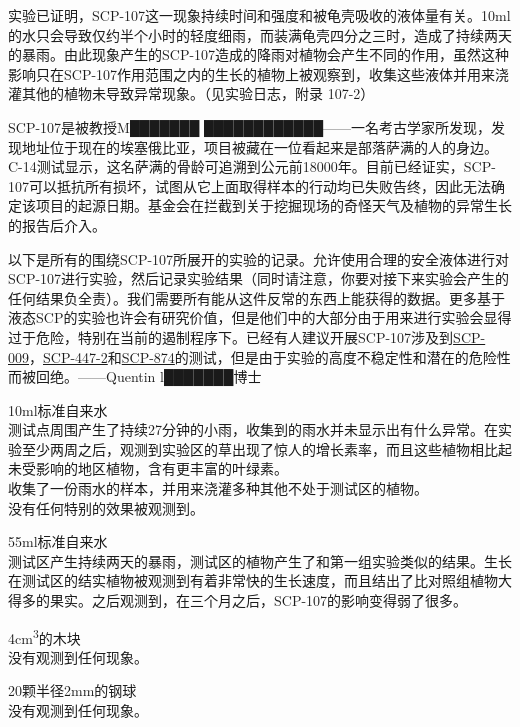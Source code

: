 实验已证明，SCP-107这一现象持续时间和强度和被龟壳吸收的液体量有关。10ml的水只会导致仅约半个小时的轻度细雨，而装满龟壳四分之三时，造成了持续两天的暴雨。由此现象产生的SCP-107造成的降雨对植物会产生不同的作用，虽然这种影响只在SCP-107作用范围之内的生长的植物上被观察到，收集这些液体并用来浇灌其他的植物未导致异常现象。（见实验日志，附录 107-2）

\hr

SCP-107是被教授M███████ ████████████——一名考古学家所发现，发现地址位于现在的埃塞俄比亚，项目被藏在一位看起来是部落萨满的人的身边。C-14测试显示，这名萨满的骨龄可追溯到公元前18000年。目前已经证实，SCP-107可以抵抗所有损坏，试图从它上面取得样本的行动均已失败告终，因此无法确定该项目的起源日期。基金会在拦截到关于挖掘现场的奇怪天气及植物的异常生长的报告后介入。

\hr

 以下是所有的围绕SCP-107所展开的实验的记录。允许使用合理的安全液体进行对SCP-107进行实验，然后记录实验结果（同时请注意，你要对接下来实验会产生的任何结果负全责）。我们需要所有能从这件反常的东西上能获得的数据。更多基于液态SCP的实验也许会有研究价值，但是他们中的大部分由于用来进行实验会显得过于危险，特别在当前的遏制程序下。已经有人建议开展SCP-107涉及到\hyperref[chap:SCP-009]{SCP-009}，\hyperref[chap:SCP-447]{SCP-447-2}和\hyperref[chap:SCP-874]{SCP-874}的测试，但是由于实验的高度不稳定性和潜在的危险性而被回绝。——Quentin l███████博士

10ml标准自来水\\
测试点周围产生了持续27分钟的小雨，收集到的雨水并未显示出有什么异常。在实验至少两周之后，观测到实验区的草出现了惊人的增长素率，而且这些植物相比起未受影响的地区植物，含有更丰富的叶绿素。\\
收集了一份雨水的样本，并用来浇灌多种其他不处于测试区的植物。\\
没有任何特别的效果被观测到。

55ml标准自来水\\
测试区产生持续两天的暴雨，测试区的植物产生了和第一组实验类似的结果。生长在测试区的结实植物被观测到有着非常快的生长速度，而且结出了比对照组植物大得多的果实。之后观测到，在三个月之后，SCP-107的影响变得弱了很多。

4cm\textsuperscript{3}的木块\\
没有观测到任何现象。

20颗半径2mm的钢球\\
没有观测到任何现象。

